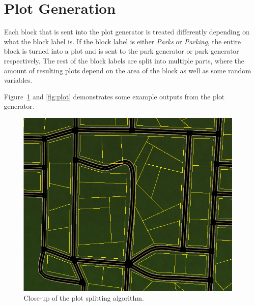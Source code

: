 \section{Plot Generation}
Each block that is sent into the plot generator is treated differently depending on what the block label is. 
If the block label is either \textit{Parks} or \textit{Parking}, the entire block is turned into a plot and is sent to the park generator or park generator respectively.
The rest of the block labels are split into multiple parts, where the amount of resulting plots depend on the area of the block as well as some random variables. 

Figure~\ref{fig:plot2} and \ref{fig:plot} demonstrates some example outputs from the plot generator.

\begin{figure}[H]
  \centering
  \begin{minipage}[b][][b]{.445\textwidth}
    \centering
    \begin{minipage}[b][][b]{0.90\textwidth}
      \centering
      \includegraphics[width=\textwidth]{figure/plot2.png}
      \caption{Close-up of the plot splitting algorithm.}
      \label{fig:plot2}
    \end{minipage}
  \end{minipage}
  \begin{minipage}[b][][b]{.545\textwidth}
    \begin{minipage}[b][][b]{0.90\textwidth}
      \centering

\end{minipage}
\end{minipage}
\end{figure}
